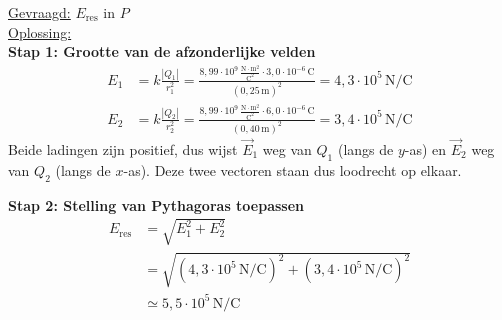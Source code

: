 \documentclass{ximera}
\begin{document}
\begin{exercise}
\begin{solution}
        \underline{Gevraagd:} $E_{\text{res}}$ in $P$\\

        \underline{Oplossing:}\\
        \textbf{Stap 1: Grootte van de afzonderlijke velden}
        \begin{align*}
            E_{1} &= k \frac{|Q_{1}|}{r_{1}^{2}} = \frac{8{,}99 \cdot 10^{9} \, \mathrm{\frac{N \cdot m^2}{C^2}} \cdot 3{,}0 \cdot 10^{-6} \, \mathrm{C}}{(0{,}25 \, \mathrm{m})^{2}} = 4{,}3 \cdot 10^{5} \, \mathrm{N/C} \\
            E_{2} &= k \frac{|Q_{2}|}{r_{2}^{2}} = \frac{8{,}99 \cdot 10^{9} \, \mathrm{\frac{N \cdot m^2}{C^2}} \cdot 6{,}0 \cdot 10^{-6} \, \mathrm{C}}{(0{,}40 \, \mathrm{m})^{2}} = 3{,}4 \cdot 10^{5} \, \mathrm{N/C}
        \end{align*}
        Beide ladingen zijn positief, dus wijst $\vec{E}_1$ weg van $Q_1$ (langs de $y$-as) en $\vec{E}_2$ weg van $Q_2$ (langs de $x$-as). Deze twee vectoren staan dus loodrecht op elkaar.

        \textbf{Stap 2: Stelling van Pythagoras toepassen}
        \begin{align*}
            E_{\text{res}} &= \sqrt{E_1^{2} + E_2^{2}} \\
                            &= \sqrt{(4{,}3 \cdot 10^{5} \, \mathrm{N/C})^{2} + (3{,}4 \cdot 10^{5} \, \mathrm{N/C})^{2}} \\
                            &\simeq \boxed{5{,}5 \cdot 10^{5} \, \mathrm{N/C}}
        \end{align*}
    \end{solution}
\end{exercise}
\end{document}
